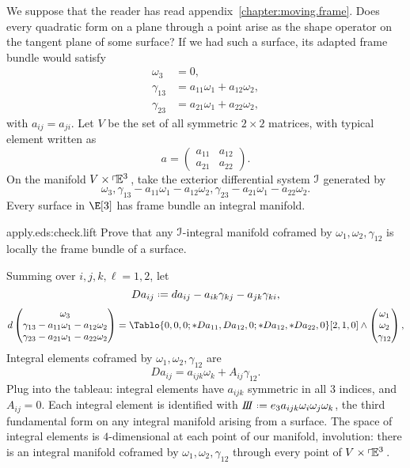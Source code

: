 %
\label{section:surface.invariants}%
We suppose that the reader has read appendix~\ref{chapter:moving.frame}.
Does every quadratic form on a plane through a point arise as the shape operator on the tangent plane of some surface?
If we had such a surface, its adapted frame bundle would satisfy
\begin{align*}
\omega_3&=0,\\
\gamma_{13}&=a_{11}\omega_1+a_{12}\omega_2,\\
\gamma_{23}&=a_{21}\omega_1+a_{22}\omega_2,
\end{align*}
with \(a_{ij}=a_{ji}\).
Let \(V\) be the set of all symmetric \(2 \times 2\) matrices, with typical element written as
\[
a=
\begin{pmatrix}
a_{11} & a_{12} \\
a_{21} & a_{22}
\end{pmatrix}.
\]
On the manifold \(V \times \left\ulcorner\!\mathbb{E}^{3}\right.\), take the exterior differential system \(\mathcal{I}\) generated by 
\[
\omega_3,\gamma_{13}-a_{11}\omega_1-a_{12}\omega_2,\gamma_{23}-a_{21}\omega_1-a_{22}\omega_2.
\]
Every surface in \(\E[3]\) has frame bundle an integral manifold.
\begin{problem}{apply.eds:check.lift}
Prove that any \(\mathcal{I}\)-integral manifold coframed by \(\omega_1,\omega_2,\gamma_{12}\) is locally the frame bundle of a surface.
\end{problem}
Summing over \(i,j,k,\ell=1,2\), let
\[
Da_{ij} \defeq da_{ij} -a_{ik}\gamma_{kj}-a_{jk}\gamma_{ki},
\]
\[
d
\begin{pmatrix}
\omega_3\\
\gamma_{13}-a_{11}\omega_1-a_{12}\omega_2\\
\gamma_{23}-a_{21}\omega_1-a_{22}\omega_2
\end{pmatrix}
=
\Tablo{0,0,0;*Da_{11},Da_{12},0;*Da_{12},*Da_{22},0}[2,1,0]
\wedge
\begin{pmatrix}
\omega_1\\
\omega_2\\
\gamma_{12}
\end{pmatrix},
\]
Integral elements coframed by \(\omega_1,\omega_2,\gamma_{12}\) are
\[
Da_{ij}=a_{ijk}\omega_k+A_{ij}\gamma_{12}.
\]
Plug into the tableau: integral elements have \(a_{ijk}\) symmetric in all \(3\) indices, and \(A_{ij}=0\).
Each integral element is identified with \(\thirdFundForm\defeq e_3 a_{ijk} \omega_i\omega_j\omega_k\), the third fundamental form on any integral manifold arising from a surface.
The space of integral elements is \(4\)-dimensional at each point of our manifold, involution: there is an integral manifold coframed by \(\omega_1,\omega_2,\gamma_{12}\) through every point of \(V \times \left\ulcorner\!\mathbb{E}^{3}\right.\).
